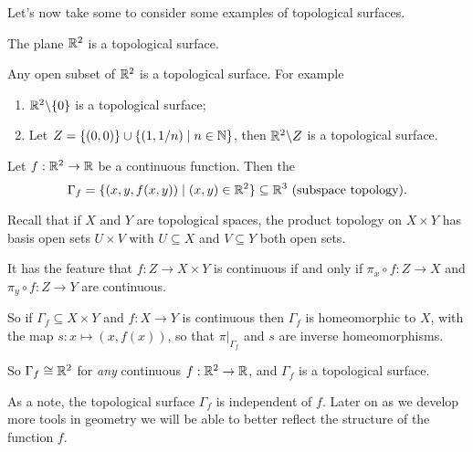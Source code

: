 \documentclass[a4paper]{scrartcl}
\begin{document}
Let's now take some to consider some examples of topological surfaces.

\begin{example}[$\R^2$]
    The plane $\R^2$ is a topological surface.
\end{example}

\begin{example}[Subsets of $\R^2$]
    Any open subset of $\R^2$ is a topological surface. For example
    \begin{enumerate}[label=(\roman*)]
        \item $\mathbb{R}^2 \backslash \{0\}$ is a topological surface;
        \item Let $Z = \{(0, 0) \} \cup \{(1, 1/n) \mid n \in \mathbb{N}\}$, then $\mathbb{R}^2 \backslash Z$ is a topological surface.
    \end{enumerate}
\end{example}

\begin{example}[Graphs]
    Let $f: \mathbb{R}^2 \rightarrow \mathbb{R}$ be a continuous function. Then the  
    $$\Gamma_f = \{(x, y, f(x, y)) \mid (x, y) \in \mathbb{R}^2\} \subseteq \mathbb{R}^3 \text{ (subspace topology)}.$$
    
    Recall that if $X$ and $Y$ are topological spaces, the product topology on $X \times Y$ has basis open sets $U \times V$ with $U \subseteq X$ and $V \subseteq Y$ both open sets.

    It has the feature that $f: Z \rightarrow X \times Y$ is continuous if and only if $\pi_x \circ f: Z \rightarrow X$ and $\pi_y \circ f: Z \rightarrow Y$ are continuous.

    So if $\Gamma_f \subseteq X \times Y$ and $f: X \rightarrow Y$ is continuous then $\Gamma_f$ is homeomorphic to $X$, with the map $s: x \mapsto (x, f(x))$, so that $\left.\pi\right|_{\Gamma_f}$ and $s$ are inverse homeomorphisms.

    So $\Gamma_f \cong \mathbb{R}^2$ for \emph{any} continuous $f: \mathbb{R}^2 \rightarrow \mathbb{R}$, and $\Gamma_f$ is a topological surface.
\end{example}

As a note, the topological surface $\Gamma_f$ is independent of $f$. Later on as we develop more tools in geometry we will be able to better reflect the structure of the function $f$. 
\end{document}
